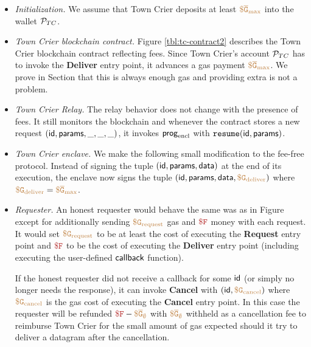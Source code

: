 \begin{itemize}[leftmargin=1.5em]
  \item {\it Initialization.}
    We assume that Town Crier deposits at least $\tt {\color{brown} \$\overline{G}_\text{max} }$ into the wallet ${\cal P}_{TC}$.

  \item {\it Town Crier blockchain contract.}
    Figure \ref{tbl:tc-contract2} describes the Town Crier blockchain contract reflecting fees.
    Since Town Crier's account ${\cal P}_{TC}$ has to invoke the {\bf Deliver} entry point, it advances a gas payment $\tt {\color{brown} \$\overline{G}_\text{max} }$.
    We prove in Section  that this is always enough gas and providing extra is not a problem.

  \item {\it Town Crier Relay.}
    The relay behavior does not change with the presence of fees.
    It still monitors the blockchain and whenever the contract \tcont stores a new request $({\sf id}, {\sf params}, \_, \_, \_)$,
    it invokes ${\sf prog}_{\textrm{encl}}$ with $\texttt{resume}({\sf id}, {\sf params})$.

  \item {\it Town Crier enclave.}
    We make the following small modification to the fee-free protocol.
    Instead of signing the tuple $({\sf id}, {\sf params}, {\sf data})$ at the end of its execution,
    the enclave now signs the tuple $({\sf id}, {\sf params}, {\sf data}, \tt {\color{brown} \$G_\text{deliver} })$ where $\tt {\color{brown} \$G_\text{deliver} } = \tt {\color{brown} \$\overline{G}_\text{max} }$.

  \item {\it Requester.}
    An honest requester would behave the same was as in Figure  except for additionally sending $\tt {\color{brown} \$G_\text{request} }$ gas and $\fee$ money with each request.
    It would set $\tt {\color{brown} \$G_\text{request} }$ to be at least the cost of executing the {\bf Request} entry point
    and $\fee$ to be the cost of executing the {\bf Deliver} entry point (including executing the user-defined ${\sf callback}$ function).

    If the honest requester did not receive a callback for some ${\sf id}$ (or simply no longer needs the response),
    it can invoke {\bf Cancel} with $({\sf id}, \tt {\color{brown} \$G_\text{cancel} })$ where $\tt {\color{brown} \$G_\text{cancel} }$ is the gas cost of executing the {\bf Cancel} entry point.
    In this case the requester will be refunded $\fee - \constgascancel$ with $\tt {\color{brown} \$\overline{G}_\emptyset }$ withheld as a cancellation fee
    to reimburse Town Crier for the small amount of gas expected should it try to deliver a datagram after the cancellation.
\end{itemize}




